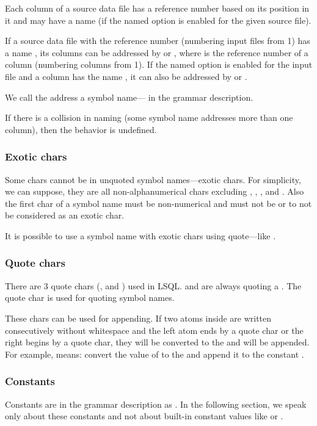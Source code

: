 Each column of a source data file has a reference number based on its position in it and may have a name (if the named option is enabled for the given source file).

If a source data file with the reference number  (numbering input files from 1) has a name , 
its columns can be addressed by  or , where  is the reference number of a column (numbering columns from 1).  
If the named option is enabled for the input file and a column has the name , it can also be addressed by  or .

We call the address a symbol name--- in the grammar description.

If there is a collision in naming (some symbol name addresses more than one column), then the behavior is undefined.

\subsubsection{Exotic chars}
Some chars cannot be in unquoted symbol names---exotic chars. For simplicity, we can suppose, they are all non-alphanumerical chars excluding \icode{-}, , \icode{\&}, and \icode{\_}.  
Also the first char of a symbol name must be non-numerical and must not be \icode{-} or   to not be considered as an exotic char.

It is possible to use a symbol name with exotic chars using  quote---like . 

\subsubsection{Quote chars}
There are 3 quote chars (,  and ) used in LSQL.  and  are always quoting a . The  quote char is used for quoting symbol names.

These chars can be used for  appending. If two atoms inside  are written consecutively without whitespace and the left atom ends by a quote char or the right begins by a quote char, 
they will be converted to the  and will be  appended. 
For example,  means: convert the value of  to the  and append it to the  constant .

\subsubsection{Constants}
Constants are in the grammar description as . In the following section, we speak only about these constants and not about built-in constant values like  or .

